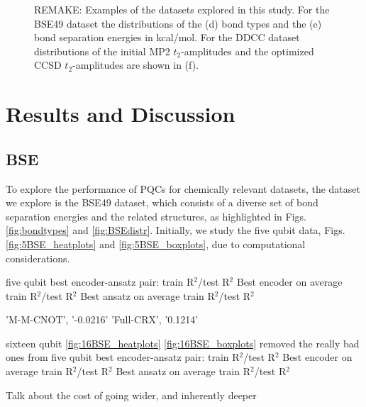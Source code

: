 \documentclass[journal=jacsat,manuscript=article]{achemso}
\begin{document}
\begin{figure}[H]
\begin{subfigure}[b]{0.3\textwidth}
		\caption{}
		\label{fig:waterddccdistribution}
	\end{subfigure}	
	\caption{REMAKE: Examples of the datasets explored in this study. For the BSE49 dataset the distributions of the (d) bond types and the (e) bond separation energies in kcal/mol. For the DDCC dataset distributions of the initial MP2 $t_{2}$-amplitudes and the optimized CCSD $t_{2}$-amplitudes are shown in (f).}
	\label{fig:bse_data}
\end{figure}





\section{Results and Discussion}
\label{section:results_and_discussion}


\subsection{BSE}
To explore the performance of PQCs for chemically relevant datasets, the dataset we explore is the BSE49 dataset, which consists of a diverse set of bond separation energies and the related structures, as highlighted in Figs. \ref{fig:bondtypes} and \ref{fig:BSEdistr}.
Initially, we study the five qubit data, Figs. \ref{fig:5BSE_heatplots} and \ref{fig:5BSE_boxplots}, due to computational considerations.



five qubit 
best encoder-ansatz pair: train R$^{2}$/test R$^{2}$
Best encoder on average train R$^{2}$/test R$^{2}$
Best ansatz on average train R$^{2}$/test R$^{2}$

'M-M-CNOT', '-0.0216'
'Full-CRX', '0.1214'

sixteen qubit \ref{fig:16BSE_heatplots} \ref{fig:16BSE_boxplots}
removed the really bad ones from five qubit
best encoder-ansatz pair: train R$^{2}$/test R$^{2}$
Best encoder on average train R$^{2}$/test R$^{2}$
Best ansatz on average train R$^{2}$/test R$^{2}$


Talk about the cost of going wider, and inherently deeper
\end{document}
